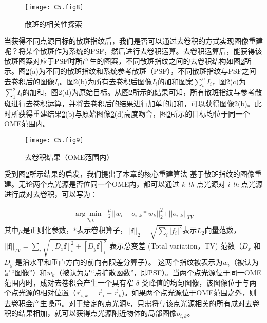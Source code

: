 \begin{figure}[htp]
	\centering
	\texttt{[image: C5.fig8]}
	\caption{散斑的相关性探索}
	\label{fig:5.8}
\end{figure}

当获得不同点源目标的散斑指纹后，我们是否可以通过去卷积的方式实现图像重建呢？将某个散斑作为系统的PSF，然后进行去卷积运算\cite{biggs_acceleration_1997}。去卷积运算后，能获得该散斑图案对应于PSF时所产生的图案，不同散斑指纹之间的去卷积结构如图\ref{fig:5.9}所示。图\ref{fig:5.9}(a)为不同的散斑指纹和系统参考散斑（PSF），不同散斑指纹与PSF之间去卷积后的图像$I_{i}$。图\ref{fig:5.9}(b)为所有去卷积后图像$I_{i}$的加和图案$\sum_{i}^{n} I_{i}$，图\ref{fig:5.9}(c)为$\sum_{1}^{2} I_{i}$的加和，图\ref{fig:5.9}(d)为原始目标。从图\ref{fig:5.9}所示的结果可知，所有散斑指纹与参考散斑进行去卷积运算，并将去卷积后的结果进行加单的加和，可以获得图像\ref{fig:5.9}(b)。此时所获得重建结果\ref{fig:5.9}(b)与原始图像\ref{fig:5.9}(d)高度吻合，图\ref{fig:5.9}所示的目标均位于同一个OME范围内。

\begin{figure}[htp]
	\centering
	\texttt{[image: C5.fig9]}
	\caption{去卷积结果（OME范围内）}
	\label{fig:5.9}
\end{figure}

受到图\ref{fig:5.9}所示结果的启发，我们提出了本章的核心重建算法-基于散斑指纹的图像重建。无论两个点光源是否位同一个OME内，都可以通过 $k$\textsl{-th} 点光源对 $i$\textsl{-th} 点光源进行成对去卷积，可以写为：

\begin{equation}
	\begin{aligned}
\underset{o_{i,k}}{\arg\min \;\;}
\frac{\mu}{2} \vert\vert w_{i}-o_{i,k}* w_{k}\vert\vert^2_{2}+\vert\vert o_{i,k}\vert\vert_{TV}
\label{eq:5.4}
\end{aligned}
\end{equation}
其中$\mu$是正则化参数，$*$表示卷积算子，$\vert\vert \mathbf{f}\vert\vert_2 = \sqrt{\sum_{i} \vert f_i\vert^2} $表示$L_{2}$向量范数，
$\vert\vert \mathbf{f} \vert\vert_{TV} = \sum_{i}\sqrt{[D_x\mathbf{f}]_i^2 +[D_y\mathbf{f}]_i^2}$ 表示总变差 (Total variation，TV) 范数（$D_x$ 和 $D_y$ 是沿水平和垂直方向的前向有限差分算子）。
这两个指纹被表示为$w_{i}$（被认为是“图像”）和$w_{k}$（被认为是“点扩散函数”，即PSF）。当两个点光源位于同一OME范围内时，成对去卷积会产生一个具有窄 $\delta$ 类峰值的均匀图像，该图像位于与两个点光源的相对位置（$\vec{r} _{i,k} = \vec{r}_i - \vec{r}_k$)。如果两个点光源位于OME范围之外，则去卷积会产生噪声。对于给定的点光源$k$，只需将与该点光源相关的所有成对去卷积的结果相加，就可以获得点光源附近物体的局部图像$o_{i,k}$。

